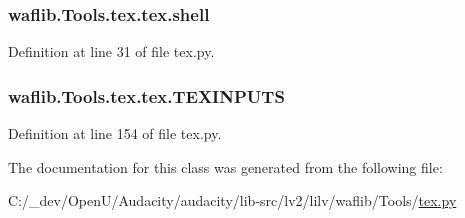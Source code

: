 \subsubsection[{\texorpdfstring{shell}{shell}}]{\setlength{\rightskip}{0pt plus 5cm}waflib.\+Tools.\+tex.\+tex.\+shell\hspace{0.3cm}{\ttfamily [static]}}\hypertarget{classwaflib_1_1_tools_1_1tex_1_1tex_a78da1827366f5e413b04098026c05d3d}{}\label{classwaflib_1_1_tools_1_1tex_1_1tex_a78da1827366f5e413b04098026c05d3d}


Definition at line 31 of file tex.\+py.

\subsubsection[{\texorpdfstring{T\+E\+X\+I\+N\+P\+U\+TS}{TEXINPUTS}}]{\setlength{\rightskip}{0pt plus 5cm}waflib.\+Tools.\+tex.\+tex.\+T\+E\+X\+I\+N\+P\+U\+TS}\hypertarget{classwaflib_1_1_tools_1_1tex_1_1tex_a0b539752e47fa4b38d3cacec38657203}{}\label{classwaflib_1_1_tools_1_1tex_1_1tex_a0b539752e47fa4b38d3cacec38657203}


Definition at line 154 of file tex.\+py.



The documentation for this class was generated from the following file\+:\begin{DoxyCompactItemize}
\item 
C\+:/\+\_\+dev/\+Open\+U/\+Audacity/audacity/lib-\/src/lv2/lilv/waflib/\+Tools/\hyperlink{lilv_2waflib_2_tools_2tex_8py}{tex.\+py}\end{DoxyCompactItemize}
